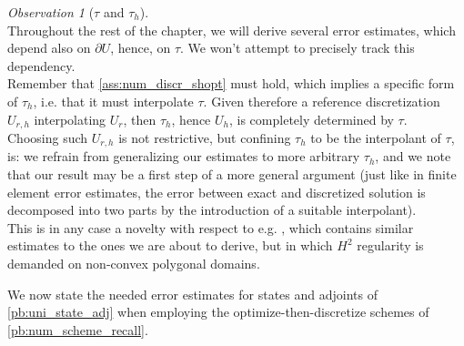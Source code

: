 \documentclass[english,a4paper,9pt,oneside]{scrbook}	%
\theoremstyle{break}
\theoremstyle{remark}
\newtheorem{obs}[equation]{Observation}
\begin{document}
\begin{obs}[$\tau$ and $\tau_h$]
\label{obs:tau_vs_tau_h}
\mbox{}\\
Throughout the rest of the chapter, we will derive several error estimates, which depend also on $\partial U$, hence, on $\tau$. We won't attempt to precisely track this dependency.
\mbox{}\\

 
Remember that \cref{ass:num_discr_shopt} must hold, which implies a specific form of $\tau_h$, i.e. that it must interpolate $\tau$. Given therefore a reference discretization $U_{r,h}$ interpolating $U_r$, then $\tau_h$, hence $U_h$, is completely determined by $\tau$. \mbox{}\\
Choosing such $U_{r,h}$ is not restrictive, but confining $\tau_h$ to be the interpolant of $\tau$, is: we refrain from generalizing our estimates to more arbitrary $\tau_h$, and we note that our result may be a first step of a more general argument (just like in finite element error estimates, the error between exact and discretized solution is decomposed into two parts by the introduction of a suitable interpolant).  \mbox{}\\


This is in any case a novelty with respect to e.g. \cite{paganini}, which contains similar estimates to the ones we are about to derive, but in which $H^2$ regularity is demanded on non-convex polygonal domains. \mbox{}\\
\end{obs}


We now state the needed error estimates for states and adjoints of \cref{pb:uni_state_adj} when employing the optimize-then-discretize schemes of \cref{pb:num_scheme_recall}.
\end{document}
